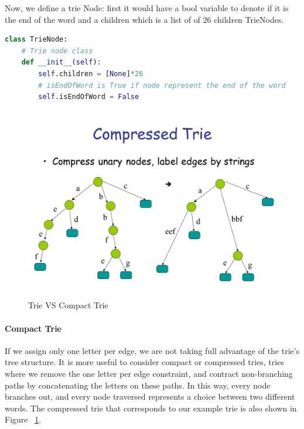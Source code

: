 \documentclass[data-structure.tex]{subfiles}
\begin{document}
Now, we define a trie Node: first it would have a bool variable to denote if it is the end of the word and a children which is a list of of 26 children TrieNodes. 
\begin{lstlisting}[language= Python]
class TrieNode:
    # Trie node class
    def __init__(self):
        self.children = [None]*26
        # isEndOfWord is True if node represent the end of the word
        self.isEndOfWord = False
\end{lstlisting}
\begin{figure}[h]
    \centering
    \includegraphics[width=0.6\columnwidth]{fig/trie_compact_trie.jpg}
    \caption{Trie VS Compact Trie}
    \label{fig:trie_compact_trie}
\end{figure}

\paragraph{Compact Trie} If we assign only one letter per edge, we are not taking full advantage of the trie’s tree structure. It is more useful to consider compact or compressed tries, tries where we remove the one letter per edge constraint, and contract non-branching paths by concatenating the letters on these paths.
In this way, every node branches out, and every node traversed represents a choice between two different words.  The compressed trie that corresponds to our example trie is also shown in Figure
~\ref{fig:trie_compact_trie}. 
\end{document}
